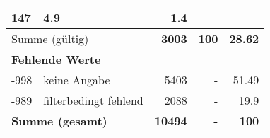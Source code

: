 \begin{longtable}{lXrrr}
       \num{147} &
       \num[round-mode=places,round-precision=2]{4.9} &
         \num[round-mode=places,round-precision=2]{1.4} \\
     \midrule
     \multicolumn{2}{l}{Summe (gültig)} &
       \textbf{\num{3003}} &
     \textbf{\num{100}} &
       \textbf{\num[round-mode=places,round-precision=2]{28.62}} \\
     \multicolumn{5}{l}{\textbf{Fehlende Werte}}\\
       -998 &
       keine Angabe &
         \num{5403} &
        - &
         \num[round-mode=places,round-precision=2]{51.49} \\
       -989 &
       filterbedingt fehlend &
         \num{2088} &
        - &
         \num[round-mode=places,round-precision=2]{19.9} \\
     \midrule
     \multicolumn{2}{l}{\textbf{Summe (gesamt)}} &
          \textbf{\num{10494}} &
        \textbf{-} &
        \textbf{\num{100}} \\
     \bottomrule
     \end{longtable}
     

